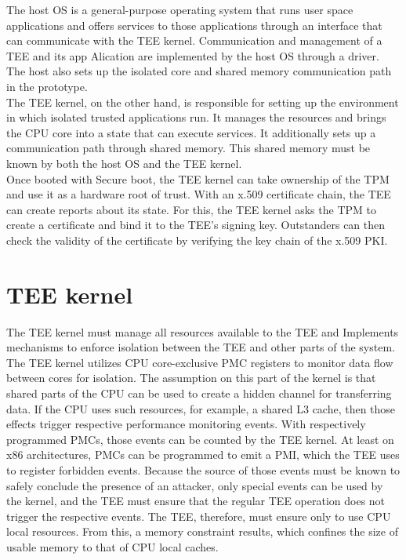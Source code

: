 The host OS is a general-purpose operating system that runs user space
applications and offers services to those applications through an interface that
can communicate with the TEE kernel. Communication and management of a TEE and
its app Alication are implemented by the host OS through a driver. The host also
sets up the isolated core and shared memory communication path in the prototype.
\\

The TEE kernel, on the other hand, is responsible for setting up the environment
in which isolated trusted applications run. It manages the resources and brings
the CPU core into a state that can execute services. It additionally sets up a
communication path through shared memory. This shared memory must be known by
both the host OS and the TEE kernel.\\

Once booted with Secure boot, the TEE kernel can take ownership of the TPM and
use it as a hardware root of trust. With an x.509 certificate chain, the TEE can
create reports about its state. For this, the TEE kernel asks the TPM to create
a certificate and bind it to the TEE's signing key. Outstanders can then check
the validity of the certificate by verifying the key chain of the x.509 PKI.


\section{TEE kernel}
\label{sec:30:tee_kernel}

The TEE kernel must manage all resources available to the  TEE and Implements
mechanisms to enforce isolation between the TEE and other parts of the system.\\

The TEE kernel utilizes CPU core-exclusive PMC registers to monitor data flow
between cores for isolation. The assumption on this part of the kernel is that
shared parts of the CPU can be used to create a hidden channel for transferring
data. If the CPU uses such resources, for example, a shared L3 cache, then those
effects trigger respective performance monitoring events. With respectively
programmed PMCs, those events can be counted by the TEE kernel. At least on x86
architectures, PMCs can be programmed to emit a PMI, which the TEE uses to
register forbidden events. Because the source of those events must be known to
safely conclude the presence of an attacker, only special events can be used by
the kernel, and the TEE must ensure that the regular TEE operation does not
trigger the respective events. The TEE, therefore, must ensure only to use CPU
local resources. From this, a memory constraint results, which confines the size
of usable memory to that of CPU local caches.\\

